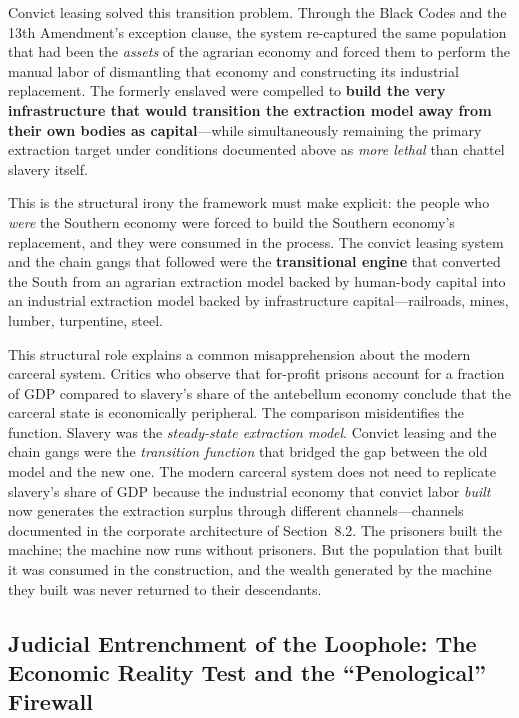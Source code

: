 Convict leasing solved this transition problem. Through the Black Codes and the 13th Amendment's exception clause, the system re-captured the same population that had been the \textit{assets} of the agrarian economy and forced them to perform the manual labor of dismantling that economy and constructing its industrial replacement. The formerly enslaved were compelled to \textbf{build the very infrastructure that would transition the extraction model away from their own bodies as capital}---while simultaneously remaining the primary extraction target under conditions documented above as \textit{more lethal} than chattel slavery itself.

This is the structural irony the framework must make explicit: the people who \textit{were} the Southern economy were forced to build the Southern economy's replacement, and they were consumed in the process. The convict leasing system and the chain gangs that followed were the \textbf{transitional engine} that converted the South from an agrarian extraction model backed by human-body capital into an industrial extraction model backed by infrastructure capital---railroads, mines, lumber, turpentine, steel.

This structural role explains a common misapprehension about the modern carceral system. Critics who observe that for-profit prisons account for a fraction of GDP compared to slavery's share of the antebellum economy conclude that the carceral state is economically peripheral. The comparison misidentifies the function. Slavery was the \textit{steady-state extraction model}. Convict leasing and the chain gangs were the \textit{transition function} that bridged the gap between the old model and the new one. The modern carceral system does not need to replicate slavery's share of GDP because the industrial economy that convict labor \textit{built} now generates the extraction surplus through different channels---channels documented in the corporate architecture of Section~8.2. The prisoners built the machine; the machine now runs without prisoners. But the population that built it was consumed in the construction, and the wealth generated by the machine they built was never returned to their descendants.

\subsection{Judicial Entrenchment of the Loophole: The Economic Reality Test and the ``Penological'' Firewall}

